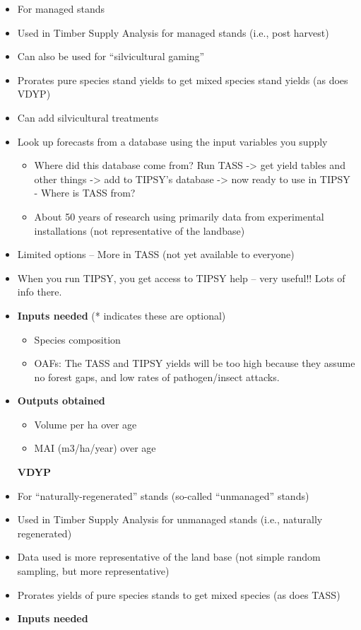 \documentclass[
  letterpaper,
]{book}
\providecommand{\tightlist}{%
  \setlength{\itemsep}{0pt}\setlength{\parskip}{0pt}}\usepackage{longtable,booktabs,array}
\begin{document}
\begin{itemize}
\item
  For managed stands
\item
  Used in Timber Supply Analysis for managed stands (i.e., post harvest)
\item
  Can also be used for ``silvicultural gaming''
\item
  Prorates pure species stand yields to get mixed species stand yields
  (as does VDYP)
\item
  Can add silvicultural treatments
\item
  Look up forecasts from a database using the input variables you supply

  \begin{itemize}
  \tightlist
  \item
    Where did this database come from? Run TASS -\textgreater{} get
    yield tables and other things -\textgreater{} add to TIPSY's
    database -\textgreater{} now ready to use in TIPSY - Where is TASS
    from?
  \item
    About 50 years of research using primarily data from experimental
    installations (not representative of the landbase)
  \end{itemize}
\item
  Limited options -- More in TASS (not yet available to everyone)
\item
  When you run TIPSY, you get access to TIPSY help -- very useful!! Lots
  of info there.
\item
  \textbf{Inputs needed} (* indicates these are optional)

  \begin{itemize}
  \tightlist
  \item
    Species composition
  \item
    OAFs: The TASS and TIPSY yields will be too high because they assume
    no forest gaps, and low rates of pathogen/insect attacks.
  \end{itemize}
\item
  \textbf{Outputs obtained}

  \begin{itemize}
  \tightlist
  \item
    Volume per ha over age
  \item
    MAI (m3/ha/year) over age
  \end{itemize}

  \textbf{VDYP}
\item
  For ``naturally-regenerated'' stands (so-called ``unmanaged'' stands)
\item
  Used in Timber Supply Analysis for unmanaged stands (i.e., naturally
  regenerated)
\item
  Data used is more representative of the land base (not simple random
  sampling, but more representative)
\item
  Prorates yields of pure species stands to get mixed species (as does
  TASS)
\item
  \textbf{Inputs needed}


\end{itemize}
\end{document}

